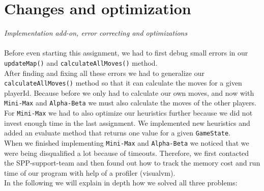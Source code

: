 \section*{Changes and optimization}
\textit{Implementation add-on, error correcting and optimizations}\\
\\
\noindent Before even starting this assignment, we had to first debug small errors in our \texttt{updateMap()} and \texttt{calculateAllMoves()} method. \\
\noindent After finding and fixing all these errors we had to generalize our \texttt{calculateAllMoves()} method so that it can calculate the moves for a given playerId. Because before we only had to calculate our own moves, and now with \texttt{Mini-Max} and \texttt{Alpha-Beta} we must also calculate the moves of the other players. \\
\noindent For \texttt{Mini-Max} we had to also optimize our heuristics further because we did not invest enough time in the last assignment. We implemented new heuristics and added an evaluate method that returns one value for a given \texttt{GameState}.\\
\noindent When we finished implementing \texttt{Mini-Max} and \texttt{Alpha-Beta} we noticed that we were being disqualified a lot because of timeouts. Therefore, we first contacted the SPP-support-team and then found out how to track the memory cost and run time of our program with help of a profiler (visualvm).\\
In the following we will explain in depth how we solved all three problems:

